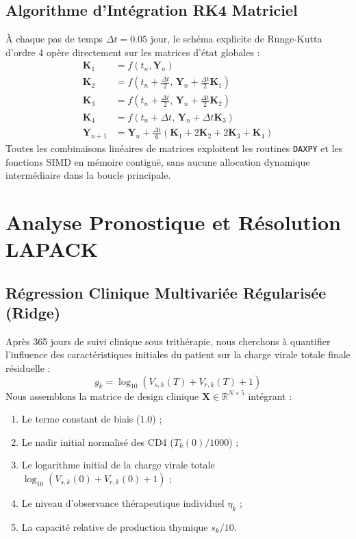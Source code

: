 \documentclass[11pt,a4paper]{report}
\theoremstyle{plain}
\theoremstyle{definition}
\theoremstyle{remark}
\begin{document}
\section{Algorithme d'Intégration RK4 Matriciel}
À chaque pas de temps $\Delta t = 0.05\text{ jour}$, le schéma explicite de Runge-Kutta d'ordre 4 opère directement sur les matrices d'état globales :
\begin{align}
\mathbf{K}_1 &= f(t_n, \mathbf{Y}_n) \\
\mathbf{K}_2 &= f(t_n + \tfrac{\Delta t}{2}, \, \mathbf{Y}_n + \tfrac{\Delta t}{2} \mathbf{K}_1) \\
\mathbf{K}_3 &= f(t_n + \tfrac{\Delta t}{2}, \, \mathbf{Y}_n + \tfrac{\Delta t}{2} \mathbf{K}_2) \\
\mathbf{K}_4 &= f(t_n + \Delta t, \, \mathbf{Y}_n + \Delta t \mathbf{K}_3) \\
\mathbf{Y}_{n+1} &= \mathbf{Y}_n + \frac{\Delta t}{6} \left(\mathbf{K}_1 + 2\mathbf{K}_2 + 2\mathbf{K}_3 + \mathbf{K}_4\right)
\end{align}
Toutes les combinaisons linéaires de matrices exploitent les routines \texttt{DAXPY} et les fonctions SIMD en mémoire contiguë, sans aucune allocation dynamique intermédiaire dans la boucle principale.

\chapter{Analyse Pronostique et Résolution LAPACK}

\section{Régression Clinique Multivariée Régularisée (Ridge)}
Après 365 jours de suivi clinique sous trithérapie, nous cherchons à quantifier l'influence des caractéristiques initiales du patient sur la charge virale totale finale résiduelle :
\begin{equation}
y_k = \log_{10}\left(V_{s,k}(T) + V_{r,k}(T) + 1\right)
\end{equation}
Nous assemblons la matrice de design clinique $\mathbf{X} \in \mathbb{R}^{N \times 5}$ intégrant :
\begin{enumerate}
    \item Le terme constant de biais ($1.0$) ;
    \item Le nadir initial normalisé des CD4 ($T_k(0) / 1000$) ;
    \item Le logarithme initial de la charge virale totale $\log_{10}(V_{s,k}(0) + V_{r,k}(0) + 1)$ ;
    \item Le niveau d'observance thérapeutique individuel $\eta_k$ ;
    \item La capacité relative de production thymique $s_k / 10$.
\end{enumerate}
\end{document}
